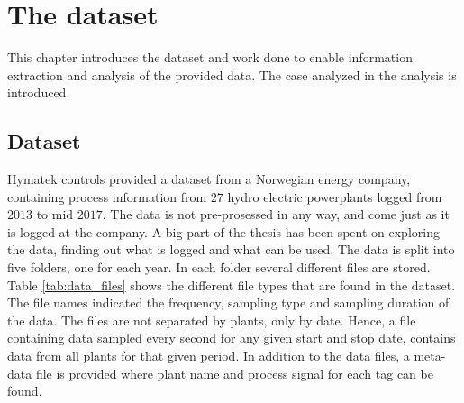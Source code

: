 \chapter{The dataset}\label{cha:data}

This chapter introduces the dataset and work done to enable information extraction and analysis of the provided data. The case analyzed in the analysis is introduced. 








\section{Dataset}\label{sec:dataset}
    Hymatek controls provided a dataset from a Norwegian energy company, containing process information from $27$ hydro electric powerplants logged from $2013$ to mid $2017$. The data is not pre-prosessed in any way, and come just as it is logged at the company. A big part of the thesis has been spent on exploring the data, finding out what is logged and what can be used. The data is split into five folders, one for each year. In each folder several different files are stored. Table \ref{tab:data_files} shows the different file types that are found in the dataset. The file names indicated the frequency, sampling type and sampling duration of the data. The files are not separated by plants, only by date. Hence, a file containing data sampled every second for any given start and stop date, contains data from all plants for that given period. In addition to the data files, a meta-data file is provided where plant name and process signal for each tag can be found.
    
